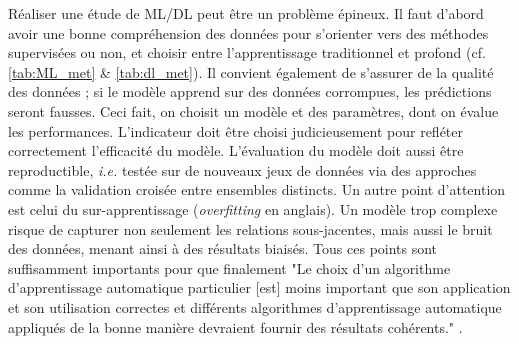 Réaliser une étude de ML/DL peut être un problème épineux. Il faut d'abord avoir une bonne compréhension des données pour s'orienter vers des méthodes supervisées ou non, et choisir entre l'apprentissage traditionnel et profond (cf. \autoref{tab:ML_met} 
\& \autoref{tab:dl_met}). Il convient également de s'assurer de la qualité des données ; si le modèle apprend sur des données corrompues, les prédictions seront fausses. Ceci fait, on choisit un modèle et des paramètres, dont on évalue les performances. L'indicateur doit être choisi judicieusement pour refléter correctement l'efficacité du modèle. L'évaluation du modèle doit aussi être reproductible, \textit{i.e.} testée sur de nouveaux jeux de données via des approches comme la validation croisée entre ensembles distincts. Un autre point d'attention est celui du sur-apprentissage (\textit{overfitting} en anglais). Un modèle trop complexe risque de capturer non seulement les relations sous-jacentes, mais aussi le bruit des données, menant ainsi à des résultats biaisés. Tous ces points sont suffisamment importants pour que finalement "Le choix d'un algorithme d'apprentissage automatique particulier [est] moins important que son application et son utilisation correctes et différents algorithmes d'apprentissage automatique appliqués de la bonne manière devraient fournir des résultats cohérents." \cite{asnicar_machine_2024}.

